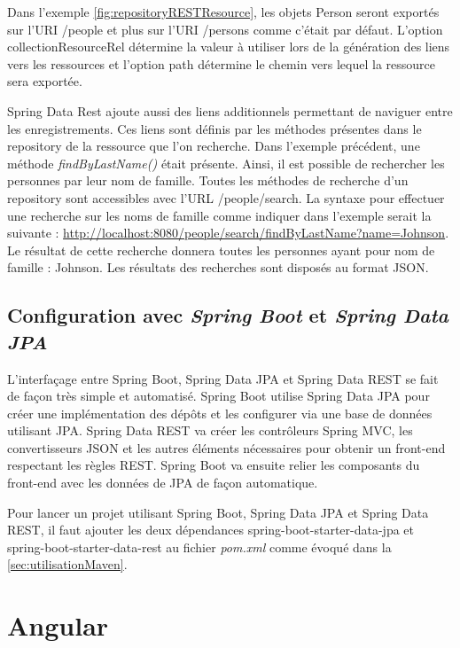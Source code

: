 \documentclass{polytech/polytech}
\begin{document}
Dans l’exemple \autoref{fig:repositoryRESTResource}, les objets Person seront exportés sur l’URI /people et plus sur l’URI /persons comme c’était par défaut. L’option collectionResourceRel détermine la valeur à utiliser lors de la génération des liens vers les ressources et l’option path détermine le chemin vers lequel la ressource sera exportée. 

Spring Data Rest ajoute aussi des liens additionnels permettant de naviguer entre les enregistrements. Ces liens sont définis par les méthodes présentes dans le repository de la ressource que l’on recherche. Dans l’exemple précédent, une méthode \textit{findByLastName()} était présente. Ainsi, il est possible de rechercher les personnes par leur nom de famille. Toutes les méthodes de recherche d’un repository sont accessibles avec l’URL /people/search. La syntaxe pour effectuer une recherche sur les noms de famille comme indiquer dans l’exemple serait la suivante : \url{http://localhost:8080/people/search/findByLastName?name=Johnson}. Le résultat de cette recherche donnera toutes les personnes ayant pour nom de famille : Johnson. Les résultats des recherches sont disposés au format JSON. 

\section{Configuration avec \textit{Spring Boot} et \textit{Spring Data JPA}}

L’interfaçage entre Spring Boot, Spring Data JPA et Spring Data REST se fait de façon très simple et automatisé. Spring Boot utilise Spring Data JPA pour créer une implémentation des dépôts et les configurer via une base de données utilisant JPA. Spring Data REST va créer les contrôleurs Spring MVC, les convertisseurs JSON et les autres éléments nécessaires pour obtenir un front-end respectant les règles REST. Spring Boot va ensuite relier les composants du front-end avec les données de JPA de façon automatique. 

Pour lancer un projet utilisant Spring Boot, Spring Data JPA et Spring Data REST, il faut ajouter les deux dépendances spring-boot-starter-data-jpa et spring-boot-starter-data-rest au fichier \textit{pom.xml} comme évoqué dans la \autoref{sec:utilisationMaven}.


\chapter{Angular}
\label{chap:angular}
\end{document}
